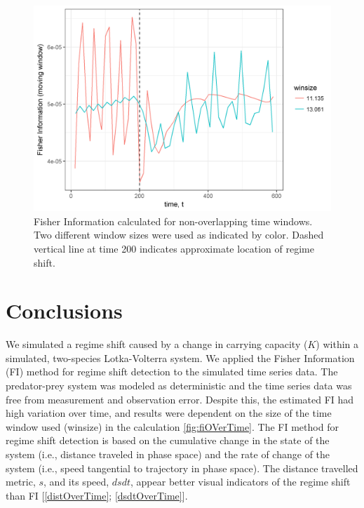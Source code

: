 \documentclass[12pt,twoside]{reedthesis}
\begin{document}
\begin{figure}
\includegraphics[width=0.85\linewidth]{./chapterFiles/fiGuide/figures/fiOverTime} \caption{Fisher Information calculated for non-overlapping time windows. Two different window sizes were used as indicated by color. Dashed vertical line at time 200 indicates approximate location of regime shift.}\label{fig:fiOverTime}
\end{figure}
\hypertarget{conclusions}{%
\section{Conclusions}\label{conclusions}}

We simulated a regime shift caused by a change in carrying capacity (\(K\)) within a simulated, two-species Lotka-Volterra system. We applied the Fisher Information (FI) method for regime shift detection to the simulated time series data. The predator-prey system was modeled as deterministic and the time series data was free from measurement and observation error. Despite this, the estimated FI had high variation over time, and results were dependent on the size of the time window used (winsize) in the calculation \ref{fig:fiOVerTime}. The FI method for regime shift detection is based on the cumulative change in the state of the system (i.e., distance traveled in phase space) and the rate of change of the system (i.e., speed tangential to trajectory in phase space). The distance travelled metric, \(s\), and its speed, \(dsdt\), appear better visual indicators of the regime shift than FI {[}\ref{distOverTime}; \ref{dsdtOverTime}{]}.
\end{document}
